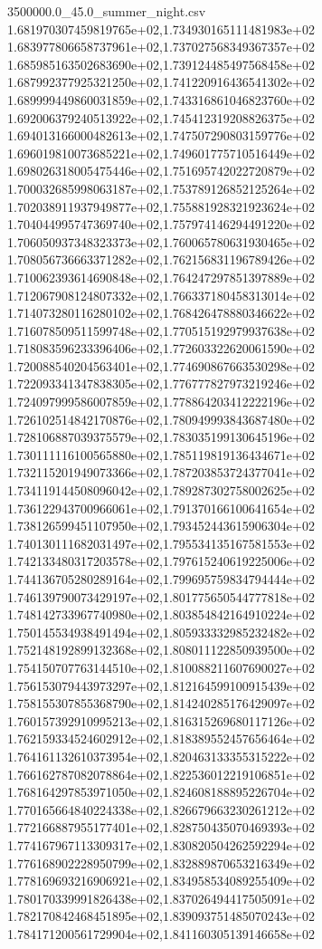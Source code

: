 \begin{filecontents*}{3500000.0_45.0_summer_night.csv}
1.681970307459819765e+02,1.734930165111481983e+02
1.683977806658737961e+02,1.737027568349367357e+02
1.685985163502683690e+02,1.739124485497568458e+02
1.687992377925321250e+02,1.741220916436541302e+02
1.689999449860031859e+02,1.743316861046823760e+02
1.692006379240513922e+02,1.745412319208826375e+02
1.694013166000482613e+02,1.747507290803159776e+02
1.696019810073685221e+02,1.749601775710516449e+02
1.698026318005475446e+02,1.751695742022720879e+02
1.700032685998063187e+02,1.753789126852125264e+02
1.702038911937949877e+02,1.755881928321923624e+02
1.704044995747369740e+02,1.757974146294491220e+02
1.706050937348323373e+02,1.760065780631930465e+02
1.708056736663371282e+02,1.762156831196789426e+02
1.710062393614690848e+02,1.764247297851397889e+02
1.712067908124807332e+02,1.766337180458313014e+02
1.714073280116280102e+02,1.768426478880346622e+02
1.716078509511599748e+02,1.770515192979937638e+02
1.718083596233396406e+02,1.772603322620061590e+02
1.720088540204563401e+02,1.774690867663530298e+02
1.722093341347838305e+02,1.776777827973219246e+02
1.724097999586007859e+02,1.778864203412222196e+02
1.726102514842170876e+02,1.780949993843687480e+02
1.728106887039375579e+02,1.783035199130645196e+02
1.730111116100565880e+02,1.785119819136434671e+02
1.732115201949073366e+02,1.787203853724377041e+02
1.734119144508096042e+02,1.789287302758002625e+02
1.736122943700966061e+02,1.791370166100641654e+02
1.738126599451107950e+02,1.793452443615906304e+02
1.740130111682031497e+02,1.795534135167581553e+02
1.742133480317203578e+02,1.797615240619225006e+02
1.744136705280289164e+02,1.799695759834794444e+02
1.746139790073429197e+02,1.801775650544777818e+02
1.748142733967740980e+02,1.803854842164910224e+02
1.750145534938491494e+02,1.805933332985232482e+02
1.752148192899132368e+02,1.808011122850939500e+02
1.754150707763144510e+02,1.810088211607690027e+02
1.756153079443973297e+02,1.812164599100915439e+02
1.758155307855368790e+02,1.814240285176429097e+02
1.760157392910995213e+02,1.816315269680117126e+02
1.762159334524602912e+02,1.818389552457656464e+02
1.764161132610373954e+02,1.820463133355315222e+02
1.766162787082078864e+02,1.822536012219106851e+02
1.768164297853971050e+02,1.824608188895226704e+02
1.770165664840224338e+02,1.826679663230261212e+02
1.772166887955177401e+02,1.828750435070469393e+02
1.774167967113309317e+02,1.830820504262592294e+02
1.776168902228950799e+02,1.832889870653216349e+02
1.778169693216906921e+02,1.834958534089255409e+02
1.780170339991826438e+02,1.837026494417505091e+02
1.782170842468451895e+02,1.839093751485070243e+02
1.784171200561729904e+02,1.841160305139146658e+02

\end{filecontents*}
